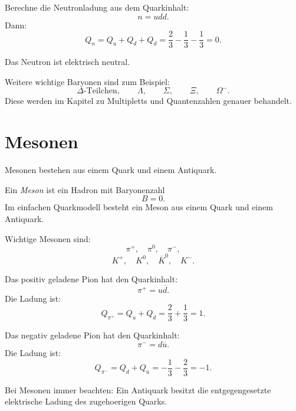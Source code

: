 \begin{examplebox}
Berechne die Neutronladung aus dem Quarkinhalt:
\[
    n=udd.
\]
Dann:
\[
    Q_n
    =
    Q_u+Q_d+Q_d
    =
    \frac{2}{3}
    -
    \frac{1}{3}
    -
    \frac{1}{3}
    =
    0.
\]

Das Neutron ist elektrisch neutral.
\end{examplebox}

\begin{notebox}
Weitere wichtige Baryonen sind zum Beispiel:
\[
    \Delta\text{-Teilchen},
    \qquad
    \Lambda,
    \qquad
    \Sigma,
    \qquad
    \Xi,
    \qquad
    \Omega^-.
\]
Diese werden im Kapitel zu Multipletts und Quantenzahlen genauer behandelt.
\end{notebox}

\section{Mesonen}

Mesonen bestehen aus einem Quark und einem Antiquark.

\begin{definitionbox}
Ein \emph{Meson} ist ein Hadron mit Baryonenzahl
\[
    B=0.
\]
Im einfachen Quarkmodell besteht ein Meson aus einem Quark und einem Antiquark.
\end{definitionbox}

\begin{conceptbox}
Wichtige Mesonen sind:
\[
    \pi^+,\quad \pi^0,\quad \pi^-,
\]
\[
    K^+,\quad K^0,\quad \overline{K}^0,\quad K^-.
\]
\end{conceptbox}

\begin{examplebox}
Das positiv geladene Pion hat den Quarkinhalt:
\[
    \pi^+ = u\overline{d}.
\]
Die Ladung ist:
\[
    Q_{\pi^+}
    =
    Q_u + Q_{\overline{d}}
    =
    \frac{2}{3}
    +
    \frac{1}{3}
    =
    1.
\]
\end{examplebox}

\begin{examplebox}
Das negativ geladene Pion hat den Quarkinhalt:
\[
    \pi^- = d\overline{u}.
\]
Die Ladung ist:
\[
    Q_{\pi^-}
    =
    Q_d + Q_{\overline{u}}
    =
    -\frac{1}{3}
    -
    \frac{2}{3}
    =
    -1.
\]
\end{examplebox}

\begin{examtipbox}
Bei Mesonen immer beachten:
Ein Antiquark besitzt die entgegengesetzte elektrische Ladung des zugehoerigen Quarks.
\end{examtipbox}

